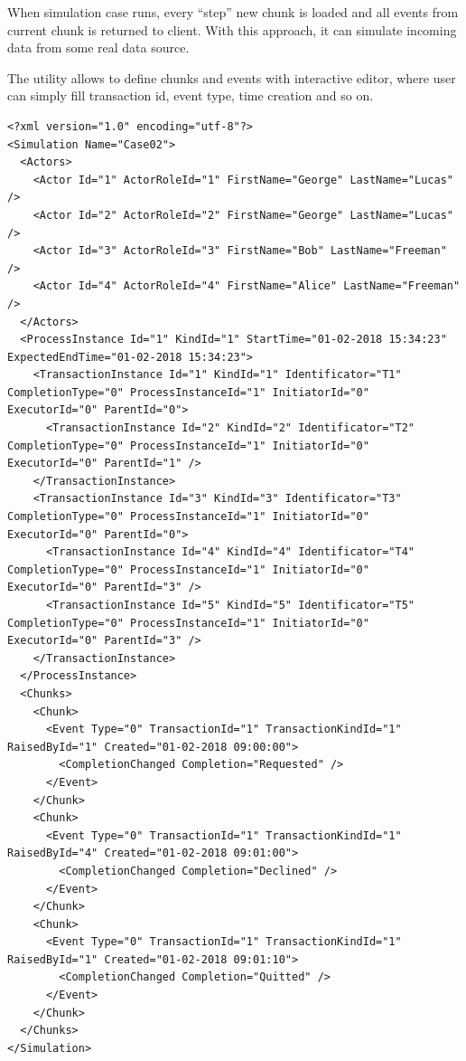 When simulation case runs, every ``step'' new chunk is loaded and all events from current chunk is returned to client. With this approach, it can simulate incoming data from some real data source.

The utility allows to define chunks and events with interactive editor, where user can simply fill transaction id, event type, time creation and so on. 

\begin{verbatim}
<?xml version="1.0" encoding="utf-8"?>
<Simulation Name="Case02">
  <Actors>
    <Actor Id="1" ActorRoleId="1" FirstName="George" LastName="Lucas" />
    <Actor Id="2" ActorRoleId="2" FirstName="George" LastName="Lucas" />
    <Actor Id="3" ActorRoleId="3" FirstName="Bob" LastName="Freeman" />
    <Actor Id="4" ActorRoleId="4" FirstName="Alice" LastName="Freeman" />
  </Actors>
  <ProcessInstance Id="1" KindId="1" StartTime="01-02-2018 15:34:23" ExpectedEndTime="01-02-2018 15:34:23">
    <TransactionInstance Id="1" KindId="1" Identificator="T1" CompletionType="0" ProcessInstanceId="1" InitiatorId="0" ExecutorId="0" ParentId="0">
      <TransactionInstance Id="2" KindId="2" Identificator="T2" CompletionType="0" ProcessInstanceId="1" InitiatorId="0" ExecutorId="0" ParentId="1" />
    </TransactionInstance>
    <TransactionInstance Id="3" KindId="3" Identificator="T3" CompletionType="0" ProcessInstanceId="1" InitiatorId="0" ExecutorId="0" ParentId="0">
      <TransactionInstance Id="4" KindId="4" Identificator="T4" CompletionType="0" ProcessInstanceId="1" InitiatorId="0" ExecutorId="0" ParentId="3" />
      <TransactionInstance Id="5" KindId="5" Identificator="T5" CompletionType="0" ProcessInstanceId="1" InitiatorId="0" ExecutorId="0" ParentId="3" />
    </TransactionInstance>
  </ProcessInstance>
  <Chunks>
    <Chunk>
      <Event Type="0" TransactionId="1" TransactionKindId="1" RaisedById="1" Created="01-02-2018 09:00:00">
        <CompletionChanged Completion="Requested" />
      </Event>
    </Chunk>
    <Chunk>
      <Event Type="0" TransactionId="1" TransactionKindId="1"  RaisedById="4" Created="01-02-2018 09:01:00">
        <CompletionChanged Completion="Declined" />
      </Event>
    </Chunk>
    <Chunk>
      <Event Type="0" TransactionId="1" TransactionKindId="1"  RaisedById="1" Created="01-02-2018 09:01:10">
        <CompletionChanged Completion="Quitted" />
      </Event>
    </Chunk>
  </Chunks>
</Simulation>
\end{verbatim}
